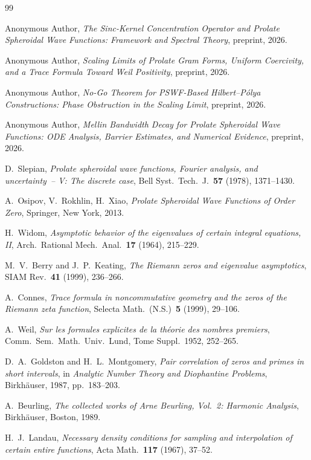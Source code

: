 \documentclass[12pt,a4paper]{amsart}
\theoremstyle{definition}
\begin{document}
\begin{thebibliography}{99}

Anonymous Author, \textit{The Sinc-Kernel Concentration Operator
and Prolate Spheroidal Wave Functions: Framework and Spectral Theory},
preprint, 2026.

Anonymous Author, \textit{Scaling Limits of Prolate Gram Forms, Uniform
Coercivity, and a Trace Formula Toward Weil Positivity},
preprint, 2026.

Anonymous Author, \textit{No-Go Theorem for PSWF-Based
Hilbert--P\'olya Constructions: Phase Obstruction in the
Scaling Limit},
preprint, 2026.

Anonymous Author, \textit{Mellin Bandwidth Decay for Prolate
Spheroidal Wave Functions: ODE Analysis, Barrier Estimates, and
Numerical Evidence},
preprint, 2026.

D.~Slepian, \textit{Prolate spheroidal wave functions, Fourier
analysis, and uncertainty~-- V: The discrete case},
Bell Syst.\ Tech.\ J.\ \textbf{57} (1978), 1371--1430.

A.~Osipov, V.~Rokhlin, H.~Xiao,
\textit{Prolate Spheroidal Wave Functions of Order Zero},
Springer, New York, 2013.

H.~Widom, \textit{Asymptotic behavior of the eigenvalues of
certain integral equations, II},
Arch.\ Rational Mech.\ Anal.\ \textbf{17} (1964), 215--229.

M.~V.~Berry and J.~P.~Keating, \textit{The Riemann zeros and
eigenvalue asymptotics},
SIAM Rev.\ \textbf{41} (1999), 236--266.

A.~Connes, \textit{Trace formula in noncommutative geometry and
the zeros of the Riemann zeta function},
Selecta Math.\ (N.S.)\ \textbf{5} (1999), 29--106.

A.~Weil, \textit{Sur les formules explicites de la th\'eorie
des nombres premiers},
Comm.\ Sem.\ Math.\ Univ.\ Lund, Tome Suppl.\ 1952, 252--265.

D.~A.~Goldston and H.~L.~Montgomery, \textit{Pair correlation of
zeros and primes in short intervals}, in \textit{Analytic Number
Theory and Diophantine Problems}, Birkh\"auser, 1987, pp.~183--203.

A.~Beurling, \textit{The collected works of Arne Beurling,
Vol.~2: Harmonic Analysis}, Birkh\"auser, Boston, 1989.

H.~J.~Landau, \textit{Necessary density conditions for sampling
and interpolation of certain entire functions},
Acta Math.\ \textbf{117} (1967), 37--52.

\end{thebibliography}
\end{document}
